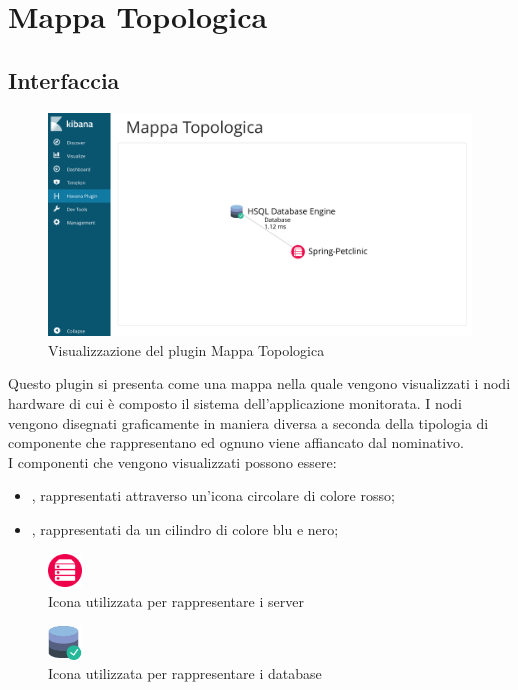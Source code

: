 \newpage
\section{Mappa Topologica}
\label{sec:mtopologica}
\subsection{Interfaccia}

\begin{figure}[H]
	\centering 
	\includegraphics[width=1\textwidth]{Images/mappa}
	\caption{Visualizzazione del plugin Mappa Topologica}
\end{figure}

Questo plugin si presenta come una mappa nella quale vengono visualizzati i nodi hardware di cui è composto il sistema dell'applicazione monitorata. 
I nodi vengono disegnati graficamente in maniera diversa a seconda della tipologia di componente che rappresentano ed ognuno viene affiancato dal nominativo. 
\\ I componenti che vengono visualizzati possono essere:
\begin{itemize}
	\item \emph{}, rappresentati attraverso un'icona circolare di colore rosso;
	\item \emph{}, rappresentati da un cilindro di colore blu e nero;
\end{itemize}
\begin{figure}[H]
	\centering 
	\includegraphics[width=0.08\textwidth]{Images/server.png}
	\caption{Icona utilizzata per rappresentare i server}
	\label{server} 
\end{figure}
\begin{figure}[H]
	\centering 
	\includegraphics[width=0.08\textwidth]{Images/database.png}
	\caption{Icona utilizzata per rappresentare i database}
	\label{database} 
\end{figure}

